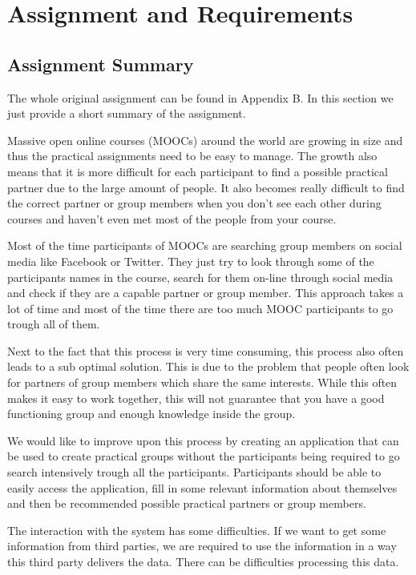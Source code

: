 \chapter{Assignment and Requirements}

\section{Assignment Summary}
The whole original assignment can be found in Appendix B. In this section we just provide a short summary of the assignment. 

Massive open online courses (MOOCs) around the world are growing in size and thus the practical assignments need to be easy to manage.
The growth also means that it is more difficult for each participant to find a possible practical partner due to the large amount of people.
It also becomes really difficult to find the correct partner or group members when you don't see each other during courses and haven't even met most of the people from your course.

Most of the time participants of MOOCs are searching group members on social media like Facebook or Twitter.
They just try to look through some of the participants names in the course, search for them on-line through social media and check if they are a capable partner or group member.
This approach takes a lot of time and most of the time there are too much MOOC participants to go trough all of them.

Next to the fact that this process is very time consuming, this process also often leads to a sub optimal solution.
This is due to the problem that people often look for partners of group members which share the same interests.
While this often makes it easy to work together, this will not guarantee that you have a good functioning group and enough knowledge inside the group.

We would like to improve upon this process by creating an application that can be used to create practical groups without the participants being required to go search intensively trough all the participants.
Participants should be able to easily access the application, fill in some relevant information about themselves and then be recommended possible practical partners or group members.

The interaction with the system has some difficulties.
If we want to get some information from third parties, we are required to use the information in a way this third party delivers the data.
There can be difficulties processing this data.

